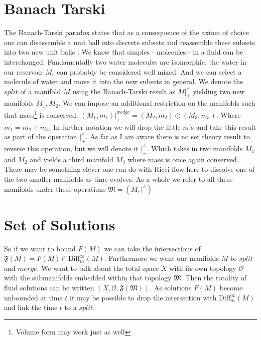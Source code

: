 \documentclass[10pt, oneside]{article}
\newcommand{\F}{\mathfrak{F}}
\begin{document}
\section*{Banach Tarski}
   The Banach-Tarski paradox states that as a consequence of the axiom of choice one can disassemble a unit ball into discrete subsets and reassemble these subsets into two new unit balls \cite{Tao2011}. We know that simples - molecules - in a fluid can be interchanged. Fundamentally two water molecules are isomorphic, the water in our reservoir $M_r$ can probably be considered well mixed. And we can select a molecule of water and move it into the new subsets in general.
   We denote the $split$ of a manifold $M$ using the Banach-Tarski result as $M|^\wedge_+$ yielding two new manifolds $M_1, M_2$. We can impose an additional restriction on the manifolds such that mass\footnote{Volume form may work just as well} is conserved. $(M_1,m_1)|^{wedge}_+ = (M_2,m_2) \oplus (M_3,m_3)$. Where $m_1 = m_2 + m_3$. In further notation we will drop the little $m$'s and take this result as part of the operation $|^\wedge_+$.
   As far as I am aware there is no set theory result to reverse this operation, but we will denote it $|^\wedge_-$. Which takes in two manifolds $M_1$ and $M_2$ and yields a third manifold $M_3$ where mass is once again conserved.
   There may be something clever one can do with Ricci flow here to dissolve one of the two smaller manifolds as time evolves.\cite{gianniotis2015ricciflowmanifoldsboundary} As a whole we refer to all these manifolds under these operations $\mathfrak{M} = (M, |^\wedge)$
\section*{Set of Solutions}
   So if we want to bound $F(M)$ we can take the intersections of $\F(M) = F(M) \cap \text{Diff}_m^\infty(M)$. Furthermore we want our manifolds $M$ to $split$ and $merge$. We want to talk about the total space $X$ with its own topology $\mathcal{O}$ with the submanifolds embedded within that topology $\mathfrak{M}$.
   Then the totality of fluid solutions can be written $(X,\mathcal{O},\F(\mathfrak{M}))$. As solutions $F(M)$ become unbounded at time $t$ it may be possible to drop the intersection with $\text{Diff}_m^\infty (M)$ and link the time $t$ to a $split$.
\end{document}
